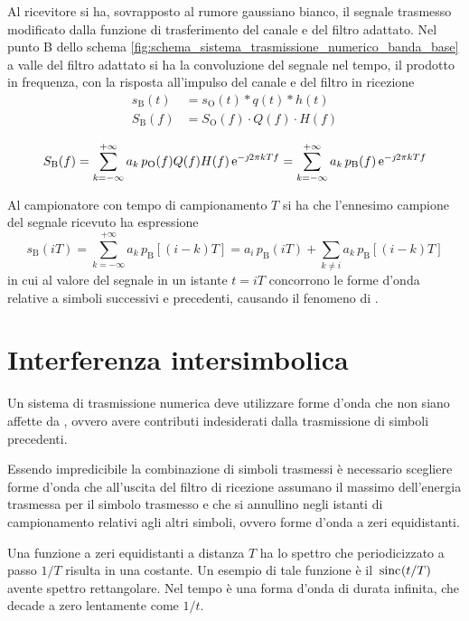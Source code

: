 Al ricevitore si ha, sovrapposto al rumore gaussiano bianco, il segnale trasmesso modificato dalla funzione di trasferimento del canale e del filtro adattato. Nel punto B dello schema \ref{fig:schema_sistema_trasmissione_numerico_banda_base} a valle del filtro adattato si ha la convoluzione del segnale nel tempo, il prodotto in frequenza, con la risposta all'impulso del canale e del filtro in ricezione
\begin{equation}
\begin{split}
s_\text{B}(t)&=s_\text{O}(t)\ast q(t)\ast h(t) \\
S_\text{B}(f)&=S_\text{O}(f)\cdot Q(f)\cdot H(f)
\end{split}
\end{equation}

\begin{equation}
S_\text{B}(f)=\sum_{k=-\infty}^{+\infty}{a_k\, p_\text{O}(f)Q(f)H(f)\operatorname{e}^{-\jmath 2\pi k T f}}=\sum_{k=-\infty}^{+\infty}{a_k\,p_\text{B}(f)\operatorname{e}^{-\jmath 2\pi k T f}}
\end{equation}

Al campionatore con tempo di campionamento $T$ si ha che l'ennesimo campione del segnale ricevuto ha espressione
\begin{equation}
s_\text{B}(i T)=\sum_{k=-\infty}^{+\infty}{a_k\,p_\text{B}[(i-k)T]}=a_i\,p_\text{B}(i T)+\sum_{k\neq i}{a_k\,p_\text{B}[(i-k)T]}
\label{eq:interferenza_intersimbolica}
\end{equation}
in cui al valore del segnale in un istante $t=i T$ concorrono le forme d'onda relative a simboli successivi e precedenti, causando il fenomeno di .

\section{Interferenza intersimbolica}
Un sistema di trasmissione numerica deve utilizzare forme d'onda che non siano affette da , ovvero avere contributi indesiderati dalla trasmissione di simboli precedenti. 

Essendo impredicibile la combinazione di simboli trasmessi è necessario scegliere forme d'onda che all'uscita del filtro di ricezione assumano il massimo dell'energia trasmessa per il simbolo trasmesso e che si annullino negli istanti di campionamento relativi agli altri simboli, ovvero forme d'onda a zeri equidistanti. 

Una funzione a zeri equidistanti a distanza $T$ ha lo spettro che periodicizzato a passo $1/T$ risulta in una costante. Un esempio di tale funzione è il $\,{\operatorname{sinc}}^{}\!\left({t/T}\right)$ avente spettro rettangolare. Nel tempo è una forma d'onda di durata infinita, che decade a zero lentamente come $1/t$.

